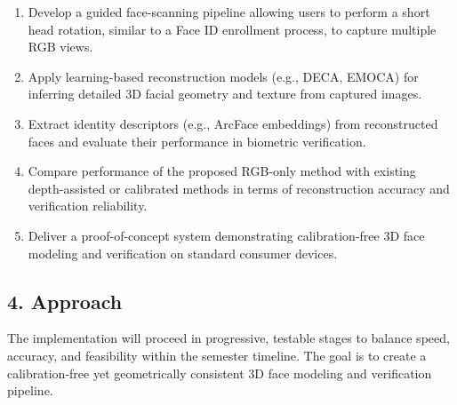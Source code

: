 \documentclass[12pt]{article}
\begin{document}
\begin{enumerate}
  \item Develop a guided face-scanning pipeline allowing users to perform a short head rotation, similar to a Face ID enrollment process, to capture multiple RGB views.
  \item Apply learning-based reconstruction models (e.g., DECA, EMOCA) for inferring detailed 3D facial geometry and texture from captured images.
  \item Extract identity descriptors (e.g., ArcFace embeddings) from reconstructed faces and evaluate their performance in biometric verification.
  \item Compare performance of the proposed RGB-only method with existing depth-assisted or calibrated methods in terms of reconstruction accuracy and verification reliability.
  \item Deliver a proof-of-concept system demonstrating calibration-free 3D face modeling and verification on standard consumer devices.
\end{enumerate}

\vspace{2em}

\subsection*{4. Approach}
The implementation will proceed in progressive, testable stages to balance speed, accuracy, and feasibility within the semester timeline. The goal is to create a calibration-free yet geometrically consistent 3D face modeling and verification pipeline.
\end{document}
